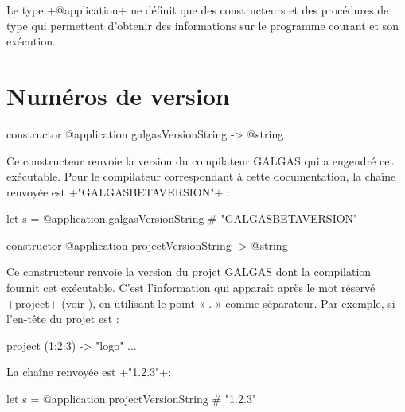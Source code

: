 



Le type \ggst+@application+ ne définit que des constructeurs et des procédures de type qui permettent d'obtenir des informations sur le programme courant et son exécution.


\section{Numéros de version}


\begin{galgas3box}
constructor @application galgasVersionString -> @string
\end{galgas3box}

Ce constructeur renvoie la version du compilateur GALGAS qui a engendré cet exécutable. Pour le compilateur correspondant à cette documentation, la chaîne renvoyée est \ggst+"GALGASBETAVERSION"+ :

\begin{galgas3}
let s = @application.galgasVersionString # "GALGASBETAVERSION"
\end{galgas3}









\begin{galgas3box}
constructor @application projectVersionString -> @string
\end{galgas3box}

Ce constructeur renvoie la version du projet GALGAS dont la compilation fournit cet exécutable. C'est l'information qui apparaît après le mot réservé \ggst+project+ (voir ), en utilisant le point « . » comme séparateur. Par exemple, si l'en-tête du projet est :

\begin{galgas3}
project (1:2:3) -> "logo" {
  ...
}
\end{galgas3}

La chaîne renvoyée est \ggst+"1.2.3"+:
\begin{galgas3}
let s = @application.projectVersionString # "1.2.3"
\end{galgas3}










